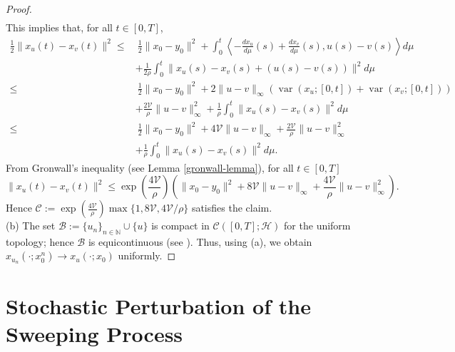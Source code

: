 \documentclass[preprint,12pt]{elsarticle}
\renewcommand{\H}{\mathcal{H}}
\newcommand{\N}{\mathbb{N}}
\theoremstyle{plain}
\theoremstyle{definition}
\theoremstyle{remark}
\begin{document}
\begin{proof}
\begin{equation*}
\begin{aligned}
			\end{aligned}
		\end{equation*}
This implies that, for all $t\in [0,T]$,
		\begin{equation*}
			\begin{aligned}  
\frac{1}{2}\|x_u(t)-x_v(t)\|^2\leq & \ \frac{1}{2}\|x_0-y_0\|^2 + \int_{0}^{t}  \left\langle -\frac{dx_u}{d\mu}(s) + \frac{dx_v}{d\mu}(s),u(s) -v(s) \right\rangle d\mu\\
				&+\frac{1}{2\rho}\int_{0}^t \|x_u(s)-x_v(s) + (u(s)-v(s))\|^2d\mu\\
				\leq & \ \frac{1}{2}\|x_0-y_0\|^2 + 2\|u-v\|_\infty(\operatorname{var}(x_u;[0,t]) + \operatorname{var}(x_v;[0,t]))\\
				& + \frac{2\mathscr{V}}{\rho}\|u-v\|_\infty^2 + \frac{1}{\rho}\int_{0}^t\|x_u(s)-x_v(s)\|^2 d\mu\\
				\leq & \ \frac{1}{2}\|x_0-y_0\|^2 +  4\mathscr{V}\|u-v\|_\infty + \frac{2\mathscr{V}}{\rho}\|u-v\|_\infty^2\\
				& + \frac{1}{\rho}\int_{0}^t\|x_u(s)-x_v(s)\|^2 d\mu.
			\end{aligned}
		\end{equation*}
From Gronwall's inequality (see Lemma \ref{gronwall-lemma}), for all $t\in [0,T]$
\begin{equation*}
\|x_u(t)-x_v(t)\|^2\leq \exp\left(\frac{4\mathscr{V}}{\rho}\right)\left(\|x_0-y_0\|^2 + 8\mathscr{V}\|u-v\|_\infty + \frac{4\mathscr{V}}{\rho}\|u-v\|_\infty^2\right).
\end{equation*}
Hence $\mathscr{C} := \exp\left(\frac{4\mathscr{V}}{\rho}\right)\max\{1,8\mathscr{V},4\mathscr{V}/\rho\}$ satisfies the claim. \\
(b) The set $\mathscr{B} := \{u_n\}_{n\in\N}\cup\{u\}$ is compact in $\mathcal{C}([0,T];\H)$ for the uniform topology; hence $\mathscr{B}$ is equicontinuous (see \cite[Theorem 47.1]{MR3728284}). Thus, using (a), we obtain $x_{u_n}(\cdot;x_0^n)\to x_u(\cdot;x_0)$ uniformly.
	\end{proof}

	\section{Stochastic Perturbation of the Sweeping Process}\label{sec7}
	
\end{document}
